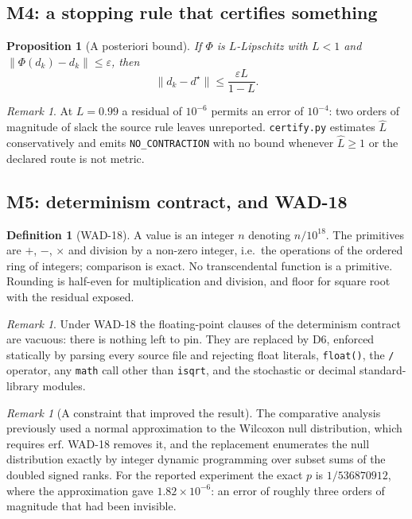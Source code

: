 \documentclass[11pt,a4paper]{article}
\theoremstyle{plain}
\newtheorem{proposition}[theorem]{Proposition}
\theoremstyle{definition}
\newtheorem{definition}[theorem]{Definition}
\theoremstyle{remark}
\newtheorem{remark}[theorem]{Remark}
\begin{document}
\subsection{M4: a stopping rule that certifies something}
\begin{proposition}[A posteriori bound]
If $\Phi$ is $L$-Lipschitz with $L<1$ and
$\lVert\Phi(d_k)-d_k\rVert\le\varepsilon$, then
\begin{equation}\label{eq:bound}
\lVert d_k-d^\star\rVert\le\frac{\varepsilon L}{1-L}.
\end{equation}
\end{proposition}
\begin{remark}
At $L=0.99$ a residual of $10^{-6}$ permits an error of $10^{-4}$: two orders of
magnitude of slack the source rule leaves unreported. \texttt{certify.py}
estimates $\hat L$ conservatively and emits \texttt{NO\_CONTRACTION} with no
bound whenever $\hat L \ge 1$ or the declared route is not metric.
\end{remark}

\subsection{M5: determinism contract, and WAD-18}
\begin{definition}[WAD-18]
A value is an integer $n$ denoting $n/10^{18}$. The primitives are $+$, $-$,
$\times$ and division by a non-zero integer, i.e.\ the operations of the
ordered ring of integers; comparison is exact. No transcendental function is a
primitive. Rounding is half-even for multiplication and division, and floor
for square root with the residual exposed.
\end{definition}
\begin{remark}
Under WAD-18 the floating-point clauses of the determinism contract are
vacuous: there is nothing left to pin. They are replaced by D6, enforced
statically by parsing every source file and rejecting float literals,
\texttt{float()}, the \texttt{/} operator, any \texttt{math} call other than
\texttt{isqrt}, and the stochastic or decimal standard-library modules.
\end{remark}
\begin{remark}[A constraint that improved the result]
The comparative analysis previously used a normal approximation to the
Wilcoxon null distribution, which requires $\mathrm{erf}$. WAD-18 removes it,
and the replacement enumerates the null distribution exactly by integer
dynamic programming over subset sums of the doubled signed ranks. For the
reported experiment the exact $p$ is $1/536870912$, where the approximation
gave $1.82\times 10^{-6}$: an error of roughly three orders of magnitude that
had been invisible.
\end{remark}
\end{document}
